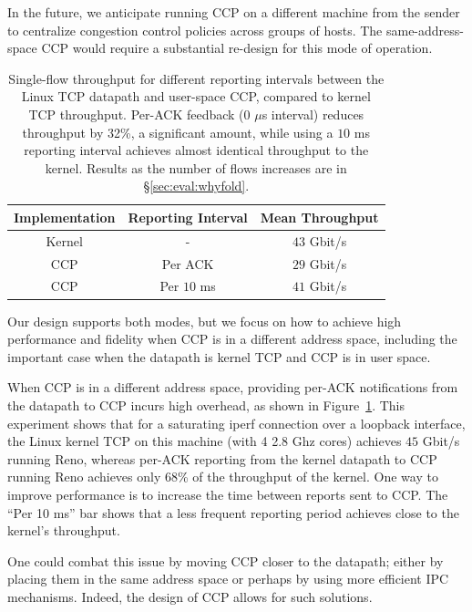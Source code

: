  In the future, we anticipate running CCP on a different machine from the sender to centralize congestion control policies across groups of hosts. 
The same-address-space CCP would require a substantial re-design for this mode of operation.

\begin{table}[]
    \centering
    \begin{tabular}{c|c|c}
        Implementation & Reporting Interval & Mean Throughput \\
        \hline
        Kernel & - & $43$ Gbit/s \\
        CCP & Per ACK & $29$ Gbit/s \\
        CCP & Per $10$ ms & $41$ Gbit/s \\
    \end{tabular}
    \caption{Single-flow throughput for different reporting intervals between the Linux TCP datapath and user-space CCP, compared to kernel TCP throughput. Per-ACK feedback (0 $\mu$s interval) reduces throughput by 32\%, a significant amount, while using a $10$ ms reporting interval achieves almost identical throughput to the kernel. Results as the number of flows  increases are in \S\ref{sec:eval:whyfold}.}\label{fig:perf:interval}
\end{table}

\smallskip

Our design supports both modes, but we focus on how to achieve high performance and fidelity when CCP is in a different address space, including the important case when the datapath is kernel TCP and CCP is in user space.

When CCP is in a different address space, providing per-ACK notifications from the datapath to CCP incurs high overhead, as shown in Figure~\ref{fig:perf:interval}. This experiment shows that for a saturating iperf connection over a loopback interface, the Linux kernel TCP on this machine  (with 4 2.8 Ghz cores) achieves $45$ Gbit/s running Reno, whereas per-ACK reporting from the kernel datapath to CCP running Reno achieves only 68\% of the throughput of the kernel. 
One way to improve performance is to increase the time between reports sent to CCP. The ``Per 10 ms'' bar shows that a less frequent reporting period achieves close to the kernel's throughput. 

One could combat this issue by moving CCP closer to the datapath; \ie either by placing them in the same address space or perhaps by using more efficient IPC mechanisms. Indeed, the design of CCP allows for such solutions. 

